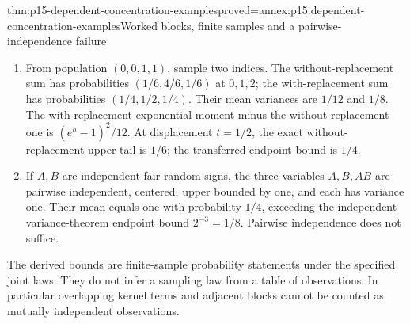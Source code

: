 \begin{hbtheorem}{thm:p15-dependent-concentration-examples}{proved=annex:p15.dependent-concentration-examples}{Worked blocks, finite samples and a pairwise-independence failure}
\begin{enumerate}
For \(n=5,r=2\), the two residue sets have sizes \(3,2\), with weights
\(3/5,2/5\), and the range-only bound is \(e^{-4t^2}\).
\item From population \((0,0,1,1)\), sample two indices.
The without-replacement sum has probabilities \((1/6,4/6,1/6)\)
at \(0,1,2\); the with-replacement sum has probabilities
\((1/4,1/2,1/4)\). Their mean variances are \(1/12\) and \(1/8\).
The with-replacement exponential moment minus the without-replacement
one is \((e^h-1)^2/12\). At displacement \(t=1/2\), the exact
without-replacement upper tail is \(1/6\); the transferred endpoint
bound is \(1/4\).
\item If \(A,B\) are independent fair random signs, the three variables
\(A,B,AB\) are pairwise independent, centered, upper bounded by one,
and each has variance one. Their mean equals one with probability
\(1/4\), exceeding the independent variance-theorem endpoint bound
\(2^{-3}=1/8\). Pairwise independence does not suffice.
\end{enumerate}
\end{hbtheorem}

The derived bounds are finite-sample probability statements under the
specified joint laws. They do not infer a sampling law from a table of
observations. In particular overlapping kernel terms and adjacent blocks
cannot be counted as mutually independent observations.
